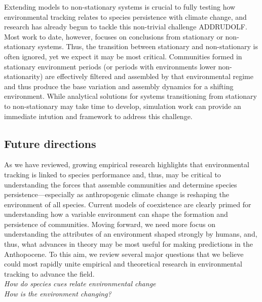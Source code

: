\documentclass[11pt,letterpaper]{article}
\begin{document}
Extending models to non-stationary systems is crucial to fully testing how environmental tracking relates to species persistence with climate change, and research has already begun to tackle this non-trivial challenge \citep{chessonnonstat,legault2019} ADDRUDOLF. Most work to date, however, focuses on conclusions from stationary or non-stationary systems. Thus, the transition between stationary and non-stationary is often ignored, yet we expect it may be most critical. Communities formed in stationary environment periods (or periods with environments lower non-stationarity) are effectively filtered and assembled by that environmental regime and thus produce the base variation and assembly dynamics for a shifting environment. While analytical solutions for systems transitioning from stationary to non-stationary may take time to develop, simulation work can provide an immediate intution and framework to address this challenge. 

\subsection{Future directions}

As we have reviewed, growing empirical research highlights that environmental tracking is linked to species performance and, thus, may be critical to understanding the forces that assemble communities and determine species persistence---especially as anthropogenic climate change is reshaping the environment of all species. Current models of coexistence are clearly primed for understanding how a variable environment can shape the formation and persistence of communities. Moving forward, we need more focus on understanding the attributes of an environment shaped strongly by humans, and, thus, what advances in theory may be most useful for making predictions in the Anthopocene. To this aim, we review several major questions that we believe could most rapidly unite empirical and theoretical research in environmental tracking to advance the field.\\ %

\emph{How do species cues relate environmental change} \\


\emph{How is the environment changing?} \\ %
\end{document}
